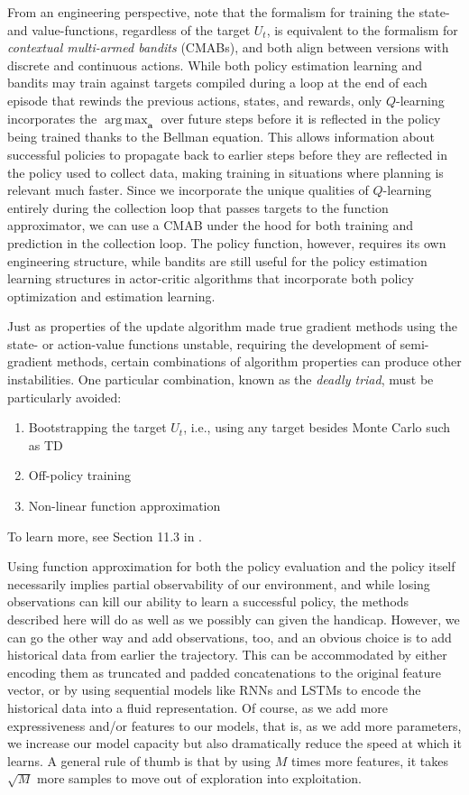 \documentclass{article}
\DeclareMathOperator*{\argmax}{arg\,max}
\begin{document}
From an engineering perspective, note that the formalism for training the state- and value-functions, regardless of the target $U_t$, is equivalent to the formalism for \textit{contextual multi-armed bandits} (CMABs), and both align between versions with discrete and continuous actions. While both policy estimation learning and bandits may train against targets compiled during a loop at the end of each episode that rewinds the previous actions, states, and rewards, only $Q$-learning incorporates the $\argmax_\mathbf{a}$ over future steps before it is reflected in the policy being trained thanks to the Bellman equation. This allows information about successful policies to propagate back to earlier steps before they are reflected in the policy used to collect data, making training in situations where planning is relevant much faster. Since we incorporate the unique qualities of $Q$-learning entirely during the collection loop that passes targets to the function approximator, we can use a CMAB under the hood for both training and prediction in the collection loop.  The policy function, however, requires its own engineering structure, while bandits are still useful for the policy estimation learning structures in actor-critic algorithms that incorporate both policy optimization and estimation learning.

Just as properties of the update algorithm made true gradient methods using the state- or action-value functions unstable, requiring the development of semi-gradient methods, certain combinations of algorithm properties can produce other instabilities. One particular combination, known as the \textit{deadly triad}, must be particularly avoided:
\begin{enumerate}
\item Bootstrapping the target $U_t$, i.e., using any target besides Monte Carlo such as TD
\item Off-policy training
\item Non-linear function approximation
\end{enumerate}
To learn more, see Section 11.3 in \cite{sutton_barto_rl}.

Using function approximation for both the policy evaluation and the policy itself necessarily implies partial observability of our environment, and while losing observations can kill our ability to learn a successful policy, the methods described here will do as well as we possibly can given the handicap. However, we can go the other way and add observations, too, and an obvious choice is to add historical data from earlier the trajectory. This can be accommodated by either encoding them as truncated and padded concatenations to the original feature vector, or by using sequential models like RNNs and LSTMs to encode the historical data into a fluid representation. Of course, as we add more expressiveness and/or features to our models, that is, as we add more parameters, we increase our model capacity but also dramatically reduce the speed at which it learns. A general rule of thumb is that by using $M$ times more features, it takes $\sqrt{M}$ more samples to move out of exploration into exploitation.
\end{document}
